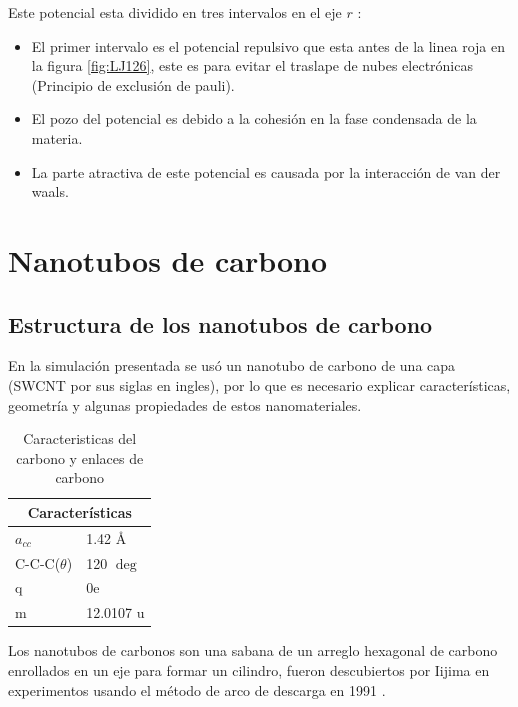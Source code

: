 Este potencial esta dividido en tres intervalos en el eje $r$ \cite{ADAMS2001763}:

\begin{itemize}
    \item El primer intervalo es el potencial repulsivo que esta antes de la linea roja en la figura \ref{fig:LJ126}, este es para evitar el traslape de nubes electrónicas (Principio de exclusión de pauli).
    \item El pozo del potencial es debido a la cohesión en la fase condensada de la materia.
    \item La parte atractiva de este potencial es causada por la interacción de van der waals.
\end{itemize}

\begingroup
\let\clearpage\relax
\chapter{Nanotubos de carbono}
\endgroup

\section{Estructura de los nanotubos de carbono}

En la simulación presentada se usó un nanotubo de carbono de una capa (SWCNT por sus siglas en ingles), por lo que es necesario explicar características, geometría y algunas propiedades de estos nanomateriales.\\

\begin{table}[h!]
    \centering
    \begin{tabular}{ |p{2cm}|p{3cm}|  }
    \hline
    \multicolumn{2}{|c|}{Características} \\
    \hline
    $a_{cc}$   & 1.42 \AA \\
    \hline
    C-C-C($\theta$)   & 120 $\deg$ \\
    \hline
    q & 0e \\
    \hline
    m   & 12.0107 u \\
    \hline
    \end{tabular}
    \caption{Caracteristicas del carbono y enlaces de carbono \cite{Melendez2016}}
    \label{carbono}
\end{table}

Los nanotubos de carbonos son una sabana de un arreglo hexagonal de carbono enrollados en un eje para formar un cilindro, fueron descubiertos por Iijima en experimentos usando el método de arco de descarga en 1991 \cite{Iijima1991}.\\

